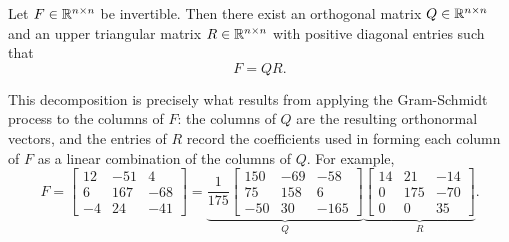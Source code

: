 \begin{definition}[QR decomposition]
    Let $F \in \mathbb{R}^{n \times n}$ be invertible. Then there exist an orthogonal matrix $Q \in \mathbb{R}^{n \times n}$ and an upper triangular matrix $R \in \mathbb{R}^{n \times n}$ with positive diagonal entries such that
    \begin{equation*}
        F = QR.
    \end{equation*}
\end{definition}
This decomposition is precisely what results from applying the Gram-Schmidt process to the columns of $F$: the columns of $Q$ are the resulting orthonormal vectors, and the entries of $R$ record the coefficients used in forming each column of $F$ as a linear combination of the columns of $Q$. For example,
\begin{equation*}
    F = \begin{bmatrix}
        12 & -51 & 4 \\
        6 & 167 & -68 \\
        -4 & 24 & -41
    \end{bmatrix}
    =
    \underbrace{\frac{1}{175}\begin{bmatrix}
        150 & -69 & -58 \\
        75 & 158 & 6 \\
        -50 & 30 & -165
    \end{bmatrix}}_{Q}
    \underbrace{\begin{bmatrix}
        14 & 21 & -14 \\
        0 & 175 & -70 \\
        0 & 0 & 35
    \end{bmatrix}}_{R}.
\end{equation*}

